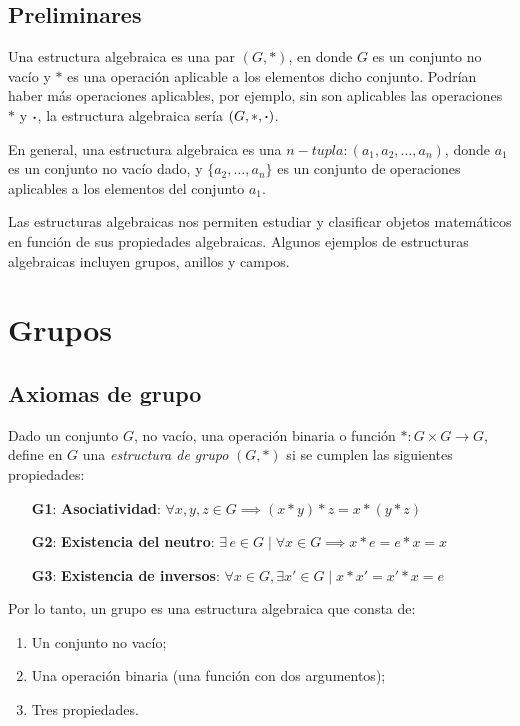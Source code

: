 \subsection{Preliminares}

Una estructura algebraica es una par $(G, *)$, en donde $G$ es un conjunto no vacío y $*$ es una operación aplicable a los elementos dicho conjunto. Podrían haber más operaciones aplicables, por ejemplo, sin son aplicables las operaciones $*$ y $\boldsymbol{\cdot}$, la estructura algebraica sería $(G, *, \boldsymbol{\cdot})$.

En general, una estructura algebraica es una $n-tupla: (a_1, a_2, \dots, a_n)$, donde $a_1$ es un conjunto no vacío dado, y $\{ a_2, \dots, a_n \}$ es un conjunto de operaciones aplicables a los elementos del conjunto $a_1$.

Las estructuras algebraicas nos permiten estudiar y clasificar objetos matemáticos en función de sus propiedades algebraicas. Algunos ejemplos de estructuras algebraicas incluyen grupos, anillos y campos.

\section{Grupos}

\subsection{Axiomas de grupo} \label{sec:axiomas-grupo}
\vspace{2mm}
\begin{fmd-definition}[Grupo]
	Dado un conjunto $G$, no vacío, una operación binaria o función $*: G \times G \rightarrow G$, define en $G$ una \textit{estructura de grupo} $(G, *)$ si se cumplen las siguientes propiedades:
	\begin{enumerate}
		\item[\textbf{G1}:] \textbf{Asociatividad}: $\forall x, y, z \in G \implies (x*y)*z = x * (y*z)$
		\item[\textbf{G2}:] \textbf{Existencia del neutro}: $\exists \, e \in G \mid \forall x \in G \implies x*e = e*x = x$
		\item[\textbf{G3}:] \textbf{Existencia de inversos}: $\forall x \in G, \exists x' \in G \mid x * x' = x'*x = e$
	\end{enumerate}
\end{fmd-definition}

Por lo tanto, un grupo es una estructura algebraica que consta de:
\begin{enumerate}[label=\alph*)]
	\item Un conjunto no vacío;
	\item Una operación binaria (una función con dos argumentos);
	\item Tres propiedades.
\end{enumerate}

